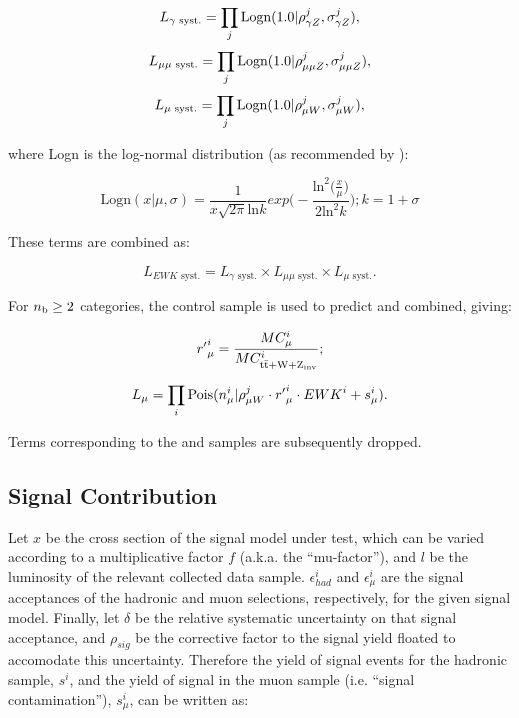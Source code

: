 \begin{equation}
L_{\gamma\text{ syst.}} = \prod_j \text{Logn}(1.0 | \rho^j_{\gamma Z}, \sigma^j_{\gamma Z}),
\end{equation}
\begin{equation}
L_{\mu\mu\text{ syst.}} = \prod_j \text{Logn}(1.0 | \rho^j_{\mu\mu Z}, \sigma^j_{\mu\mu Z}),
\end{equation}
\begin{equation}
L_{\mu\text{ syst.}} = \prod_j \text{Logn}(1.0 | \rho^j_{\mu W}, \sigma^j_{\mu W}),
\end{equation}

where Logn is the log-normal distribution (as recommended by \cite{cousins-log-normal}):

\begin{equation}
\text{Logn}(x|\mu, \sigma) = \frac{1}{x\sqrt{2\pi}\text{ln}k} exp \Bigg(-\frac{\text{ln}^2 \big(\frac{x}{\mu}\big)}{2\text{ln}^2k}\Bigg); k = 1+\sigma
\end{equation}

These terms are combined as:

\begin{equation}
L_{EWK\text{ syst.}} = L_{\gamma\text{ syst.}} \times L_{\mu\mu\text{ syst.}} \times L_{\mu\text{ syst.}}.
\end{equation}

For $n_{\text{b}} \geq 2$ categories, the \mj control sample is used to predict \zinv and
\ttw combined, giving:

\begin{equation}
{r'}^i_{\mu} = \frac{MC_{\mu}^i}{MC^i_{\rm{t}\bar{\rm{t}} + W + Z_{\text{inv}}}};
\end{equation}

\begin{equation}
L_{\mu} = \prod_i \text{Pois}(n_{\mu}^i | \rho^j_{\mu W} \cdot {r'}_{\mu}^i \cdot {EWK}^i + s_{\mu}^i).
\end{equation}

Terms corresponding to the \mmj and \gj samples are subsequently dropped.

\subsection{Signal Contribution}

Let $x$ be the cross section of the signal model under test, which can be varied
according to a multiplicative factor $f$ (a.k.a. the ``mu-factor''), and $l$ be 
the luminosity of the relevant collected data sample. $\epsilon^i_{had}$ and
$\epsilon^i_{\mu}$ are the signal acceptances of the hadronic and muon 
selections, respectively, for the given signal model. Finally, let $\delta$ be 
the relative systematic uncertainty on that signal acceptance, and $\rho_{sig}$ 
be the corrective factor to the signal yield floated to accomodate this uncertainty. 
Therefore the yield of signal events for the hadronic sample, $s^i$, and the 
yield of signal in the muon sample (i.e. ``signal contamination''), $s^i_{\mu}$,
can be written as:

